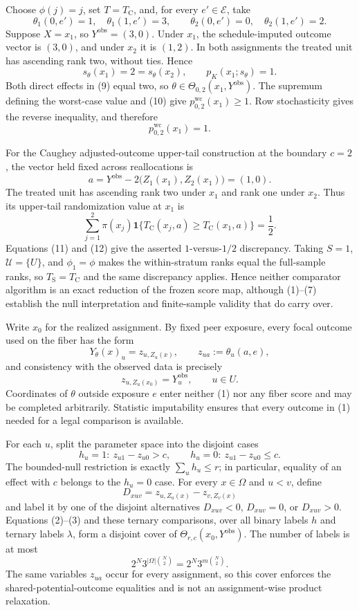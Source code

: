 Choose \(\phi(j)=j\), set \(T=T_{\mathrm C}\), and, for every \(e'\in\mathcal E\), take
\[
 \theta_1(0,e')=1,\quad \theta_1(1,e')=3,
 \qquad
 \theta_2(0,e')=0,\quad \theta_2(1,e')=2.
\tag{9}
\]
Suppose \(X=x_1\), so \(Y^{\mathrm{obs}}=(3,0)\).  Under \(x_1\), the schedule-imputed outcome vector is \((3,0)\), and under \(x_2\) it is \((1,2)\).  In both assignments the treated unit has ascending rank two, without ties.  Hence
\[
 s_\theta(x_1)=2=s_\theta(x_2),
 \qquad p_K(x_1;s_\theta)=1.
\tag{10}
\]
Both direct effects in (9) equal two, so \(\theta\in\Theta_{0,2}(x_1,Y^{\mathrm{obs}})\).  The supremum defining the worst-case value and (10) give \(p^{\mathrm{wc}}_{0,2}(x_1)\geq1\).  Row stochasticity gives the reverse inequality, and therefore
\[
 p^{\mathrm{wc}}_{0,2}(x_1)=1.
\tag{11}
\]

For the Caughey adjusted-outcome upper-tail construction at the boundary \(c=2\), the vector held fixed across reallocations is
\[
 a=Y^{\mathrm{obs}}-2\bigl(Z_1(x_1),Z_2(x_1)\bigr)=(1,0).
\]
The treated unit has ascending rank two under \(x_1\) and rank one under \(x_2\).  Thus its upper-tail randomization value at \(x_1\) is
\[
 \sum_{j=1}^{2}\pi(x_j)
 \mathbf 1\{T_{\mathrm C}(x_j,a)\geq T_{\mathrm C}(x_1,a)\}
 =\frac12.
\tag{12}
\]
Equations (11) and (12) give the asserted \(1\)-versus-\(1/2\) discrepancy.  Taking \(S=1\), \(\mathcal U=\{U\}\), and \(\phi_1=\phi\) makes the within-stratum ranks equal the full-sample ranks, so \(T_{\mathrm S}=T_{\mathrm C}\) and the same discrepancy applies.  Hence neither comparator algorithm is an exact reduction of the frozen score map, although (1)--(7) establish the null interpretation and finite-sample validity that do carry over.

Write \(x_0\) for the realized assignment.  By fixed peer exposure, every focal outcome used on the fiber has the form
\[
 Y_\theta(x)_u=z_{u,Z_u(x)},
 \qquad z_{ua}:=\theta_u(a,e),
\tag{1}
\]
and consistency with the observed data is precisely
\[
 z_{u,Z_u(x_0)}=Y^{\mathrm{obs}}_u,
 \qquad u\in U.
\tag{2}
\]
Coordinates of \(\theta\) outside exposure \(e\) enter neither (1) nor any fiber score and may be completed arbitrarily.  Statistic imputability ensures that every outcome in (1) needed for a legal comparison is available.

For each \(u\), split the parameter space into the disjoint cases
\[
 h_u=1:\ z_{u1}-z_{u0}>c,
 \qquad
 h_u=0:\ z_{u1}-z_{u0}\leq c.
\tag{3}
\]
The bounded-null restriction is exactly \(\sum_u h_u\leq r\); in particular, equality of an effect with \(c\) belongs to the \(h_u=0\) case.  For every \(x\in\Omega\) and \(u<v\), define
\[
 D_{xuv}=z_{u,Z_u(x)}-z_{v,Z_v(x)}
\]
and label it by one of the disjoint alternatives \(D_{xuv}<0\), \(D_{xuv}=0\), or \(D_{xuv}>0\).  Equations (2)--(3) and these ternary comparisons, over all binary labels \(h\) and ternary labels \(\lambda\), form a disjoint cover of \(\Theta_{r,c}(x_0,Y^{\mathrm{obs}})\).  The number of labels is at most
\[
 2^N3^{|\Omega|\binom N2}=2^N3^{m\binom N2}.
\tag{4}
\]
The same variables \(z_{ua}\) occur for every assignment, so this cover enforces the shared-potential-outcome equalities and is not an assignment-wise product relaxation.

